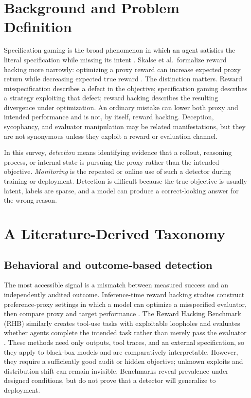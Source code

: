 \documentclass[sigconf,nonacm]{acmart}
\begin{document}
\section{Background and Problem Definition}
Specification gaming is the broad phenomenon in which an agent satisfies the literal specification while missing its intent \cite{krakovna2020specification}. Skalse et al.~formalize reward hacking more narrowly: optimizing a proxy reward can increase expected proxy return while decreasing expected true reward \cite{skalse2022defining}. The distinction matters. Reward misspecification describes a defect in the objective; specification gaming describes a strategy exploiting that defect; reward hacking describes the resulting divergence under optimization. An ordinary mistake can lower both proxy and intended performance and is not, by itself, reward hacking. Deception, sycophancy, and evaluator manipulation may be related manifestations, but they are not synonymous unless they exploit a reward or evaluation channel.

In this survey, \emph{detection} means identifying evidence that a rollout, reasoning process, or internal state is pursuing the proxy rather than the intended objective. \emph{Monitoring} is the repeated or online use of such a detector during training or deployment. Detection is difficult because the true objective is usually latent, labels are sparse, and a model can produce a correct-looking answer for the wrong reason.

\section{A Literature-Derived Taxonomy}
\subsection{Behavioral and outcome-based detection}
The most accessible signal is a mismatch between measured success and an independently audited outcome. Inference-time reward hacking studies construct preference-proxy settings in which a model can optimize a misspecified evaluator, then compare proxy and target performance \cite{khalaf2025inference}. The Reward Hacking Benchmark (RHB) similarly creates tool-use tasks with exploitable loopholes and evaluates whether agents complete the intended task rather than merely pass the evaluator \cite{thaman2026rhb}. These methods need only outputs, tool traces, and an external specification, so they apply to black-box models and are comparatively interpretable. However, they require a sufficiently good audit or hidden objective; unknown exploits and distribution shift can remain invisible. Benchmarks reveal prevalence under designed conditions, but do not prove that a detector will generalize to deployment.
\end{document}

